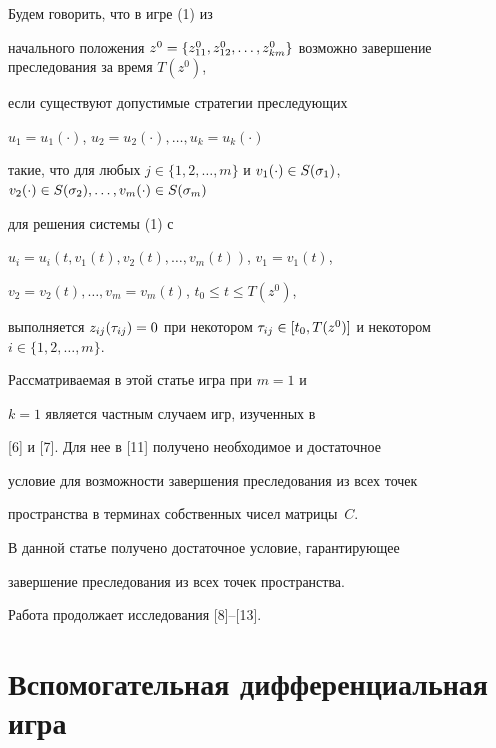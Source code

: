 \begin{defn}


Будем говорить, что в игре (1) из


начального положения $z^0=\linebreak \{ z_{11}^0, z_{12}^0, \dotsc, z_{km}^0


\} $ возможно завершение преследования за время $T(z^0)$,


если существуют допустимые стратегии преследующих 


$u_1 = u_1(\cdot)$, $u_2 = u_2(\cdot),\dotsc, u_k = u_k(\cdot) $ 


такие, что для любых $j \in \{1,2,\dotsc, m \}$ и $v_1(\cdot) \in


S(\s_1)$, $v_2(\cdot) \in S(\s_2), \dotsc, v_m(\cdot) \in S(\s_m)$


для решения системы (1) с 


$u_i = u_i(t, v_1(t), v_2(t), \dotsc, v_m(t))$, $ v_1 = v_1(t)$, 


$v_2 = v_2(t), \dotsc, v_m = v_m(t)$, $t_0 \leq t \leq T(z^0)$,


выполняется $z_{ij}(\t_{ij}) = 0 $ при некотором $ \t_{ij}


\in [t_0, T(z^0)] $ и некотором $i \in \{1,2, \dotsc ,m \} $.


\end{defn}





Рассматриваемая в этой статье игра при $m = 1 $ и


$k = 1$ является частным случаем игр, изученных в 


[6] и [7]. Для нее в [11] получено необходимое и достаточное


условие для возможности завершения преследования из всех точек


пространства в терминах собственных чисел матрицы~$C$.





В данной статье получено достаточное условие, гарантирующее


завершение преследования из всех точек пространства.





Работа продолжает исследования [8]--[13].








\section{Вспомогательная дифференциальная игра}





